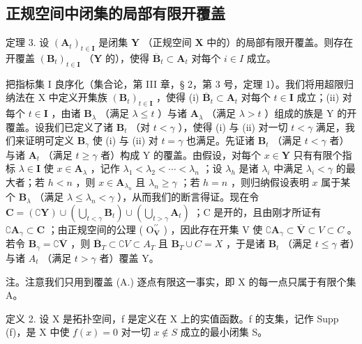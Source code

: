 \subsection{正规空间中闭集的局部有限开覆盖}

定理 3. 设 \((\mathbf{A}_t)_{t\in \mathbf{I}}\) 是闭集 \(\mathbf{Y}\) （正规空间 \(\mathbf{X}\) 中的）的局部有限开覆盖。则存在开覆盖 \((\mathbf{B}_t)_{t\in \mathbf{I}}\) （\(\mathbf{Y}\) 的），使得 \(\overline{\mathbf{B}}_t\subset \mathbf{A}_t\) 对每个 \(i\in I\) 成立。

把指标集 I 良序化（集合论，第 III 章，§ 2，第 3 号，定理 1）。我们将用超限归纳法在 X 中定义开集族 \((\mathbf{B}_t)_{t \in \mathbf{I}}\) ，使得 (i) \(\overline{\mathbf{B}}_t \subset \mathbf{A}_t\) 对每个 \(t \in \mathbf{I}\) 成立；(ii) 对每个 \(t \in \mathbf{I}\) ，由诸 \(\mathbf{B}_\lambda\) （满足 \(\lambda \leqslant t\) ）与诸 \(\mathbf{A}_\lambda\) （满足 \(\lambda > t\) ）组成的族是 Y 的开覆盖。设我们已定义了诸 \(\mathbf{B}_t\) （对 \(t < \gamma\) ），使得 (i) 与 (ii) 对一切 \(t < \gamma\) 满足，我们来证明可定义 \(\mathbf{B}_\gamma\) 使 (i) 与 (ii) 对 \(t = \gamma\) 也满足。先证诸 \(\mathbf{B}_t\) （满足 \(t < \gamma\) 者）与诸 \(\mathbf{A}_t\) （满足 \(t \geqslant \gamma\) 者）构成 Y 的覆盖。由假设，对每个 \(x \in \mathbf{Y}\) 只有有限个指标 \(\lambda \in \mathbf{I}\) 使 \(x \in \mathbf{A}_\lambda\) ，记作 \(\lambda_1 < \lambda_2 < \cdots < \lambda_n\) ；设 \(\lambda_h\) 是诸 \(\lambda_i\) 中满足 \(\lambda_i < \gamma\) 的最大者；若 \(h < n\) ，则 \(x \in \mathbf{A}_{\lambda_n}\) 且 \(\lambda_n \geqslant \gamma\) ；若 \(h = n\) ，则归纳假设表明 \(x\) 属于某个 \(\mathbf{B}_\lambda\) （满足 \(\lambda \leqslant \lambda_n < \gamma\) ），从而我们的断言得证。现在令 \(\mathbf{C} = (\complement\mathbf{Y}) \cup (\bigcup_{t < \gamma} \mathbf{B}_t) \cup (\bigcup_{t > \gamma} \mathbf{A}_t)\) ；C 是开的，且由刚才所证有 \(\complement\mathbf{A}_\gamma \subset \mathbf{C}\) ；由正规空间的公理 ( \(\mathrm{O}_{\mathbf{V}}^{\prime\prime}\) ) ，因此存在开集 V 使 \(\complement\mathbf{A}_\gamma \subset \overline{\mathbf{V}} \subset V \subset C\) 。若令 \(\mathbf{B}_\gamma = \complement\overline{\mathbf{V}}\) ，则 \(\overline{\mathbf{B}}_T \subset \complement V \subset A_T\) 且 \(\mathbf{B}_T \cup C = X\) ，于是诸 \(\mathbf{B}_t\) （满足 \(t \leqslant \gamma\) 者）与诸 \(A_t\) （满足 \(t > \gamma\) 者）覆盖 Y。

注。注意我们只用到覆盖 (A.) 逐点有限这一事实，即 X 的每一点只属于有限个集 A。

定义 2. 设 X 是拓扑空间，f 是定义在 X 上的实值函数。f 的支集，记作 Supp (f)，是 X 中使 \(f(x) = 0\) 对一切 \(x \notin S\) 成立的最小闭集 S。

